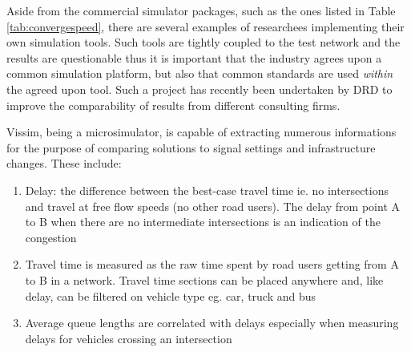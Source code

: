 Aside from the commercial simulator packages, such as the ones listed in Table \ref{tab:convergespeed}, there are several examples of researchees implementing their own simulation tools. Such tools are tightly coupled to the test network and the results are questionable thus it is important that the industry agrees upon a common simulation platform, but also that common standards are used \textit{within} the agreed upon tool. Such a project has recently been undertaken by DRD to improve the comparability of results from different consulting firms.

Vissim, being a microsimulator, is capable of extracting numerous informations for the purpose of comparing solutions to signal settings and infrastructure changes. These include: 

\begin{enumerate}
\item Delay: the difference between the best-case travel time ie. no intersections and travel at free flow speeds (no other road users). The delay from point A to B when there are no intermediate intersections is an indication of the congestion
\item Travel time is measured as the raw time spent by road users getting from A to B in a network. Travel time sections can be placed anywhere and, like delay, can be filtered on vehicle type eg. car, truck and bus
\item Average queue lengths are correlated with delays especially when measuring delays for vehicles crossing an intersection
\end{enumerate}

